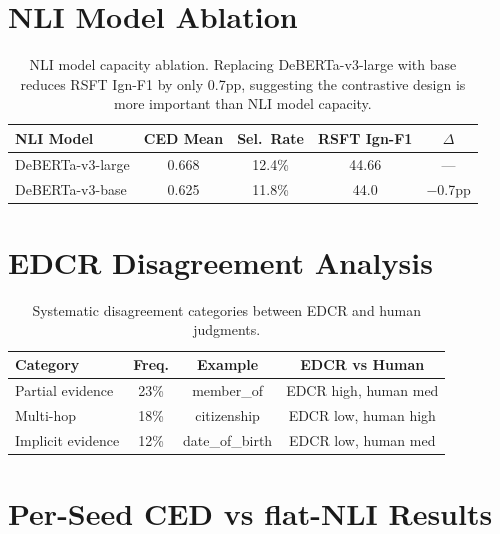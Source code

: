 \documentclass[11pt,a4paper]{article}
\begin{document}
\section{NLI Model Ablation}
\label{app:nli-ablation}

\begin{table}[h]
\centering
\small
\begin{tabular}{lcccc}
\toprule
\textbf{NLI Model} & \textbf{CED Mean} & \textbf{Sel.\ Rate} & \textbf{RSFT Ign-F1} & \textbf{$\Delta$} \\
\midrule
DeBERTa-v3-large & 0.668 & 12.4\% & 44.66 & --- \\
DeBERTa-v3-base & 0.625 & 11.8\% & 44.0 & $-$0.7pp \\
\bottomrule
\end{tabular}
\caption{NLI model capacity ablation. Replacing DeBERTa-v3-large with base reduces RSFT Ign-F1 by only 0.7pp, suggesting the contrastive design is more important than NLI model capacity.}
\label{tab:nli-ablation}
\end{table}

\section{EDCR Disagreement Analysis}
\label{app:disagreement}

\begin{table}[h]
\centering
\small
\begin{tabular}{lccc}
\toprule
\textbf{Category} & \textbf{Freq.} & \textbf{Example} & \textbf{EDCR vs Human} \\
\midrule
Partial evidence & 23\% & member\_of & EDCR high, human med \\
Multi-hop & 18\% & citizenship & EDCR low, human high \\
Implicit evidence & 12\% & date\_of\_birth & EDCR low, human med \\
\bottomrule
\end{tabular}
\caption{Systematic disagreement categories between EDCR and human judgments.}
\label{tab:disagreement}
\end{table}

\section{Per-Seed CED vs flat-NLI Results}
\label{app:per-seed}
\end{document}
